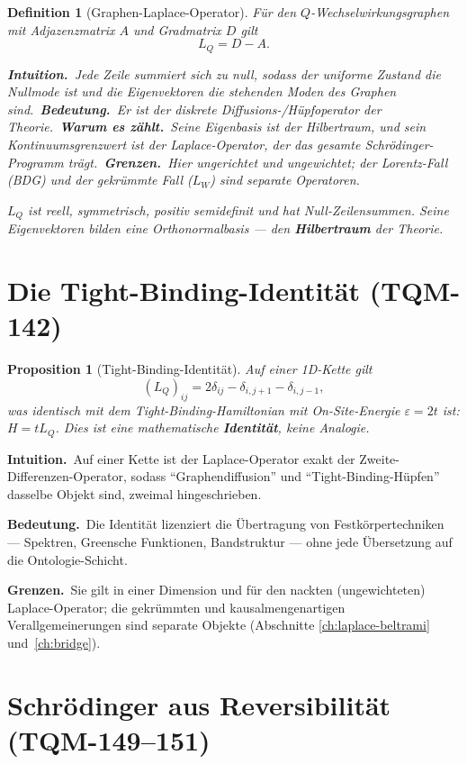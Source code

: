 \documentclass[10pt,twoside,openany]{book}
\newtheorem{proposition}[theorem]{Proposition}
\newtheorem{definition}[theorem]{Definition}
\newcommand{\theoremnotes}[3]{%
  \par\medskip\noindent
  \textbf{Intuition.}\ #1\par
  \textbf{Bedeutung.}\ #2\par
  \textbf{Grenzen.}\ #3\par}
\newcommand{\eqnotes}[4]{%
  \par\smallskip\noindent
  \textbf{Intuition.}\ #1\ 
  \textbf{Bedeutung.}\ #2\ 
  \textbf{Warum es zählt.}\ #3\ 
  \textbf{Grenzen.}\ #4\par}
\begin{document}
\begin{definition}[Graphen-Laplace-Operator]
Für den $Q$-Wechselwirkungsgraphen mit Adjazenzmatrix $A$ und Gradmatrix $D$ gilt
\begin{equation}
L_Q = D - A .
\end{equation}

\eqnotes
{Jede Zeile summiert sich zu null, sodass der uniforme Zustand die Nullmode ist und die
Eigenvektoren die stehenden Moden des Graphen sind.}
{Er ist der diskrete Diffusions-/Hüpfoperator der Theorie.}
{Seine Eigenbasis \emph{ist} der Hilbertraum, und sein Kontinuumsgrenzwert ist der
Laplace-Operator, der das gesamte Schr\"odinger-Programm trägt.}
{Hier ungerichtet und ungewichtet; der Lorentz-Fall (BDG) und der gekrümmte Fall ($L_W$)
sind separate Operatoren.}
$L_Q$ ist reell, symmetrisch, positiv semidefinit und hat Null-Zeilensummen. Seine
Eigenvektoren bilden eine Orthonormalbasis — den \textbf{Hilbertraum} der Theorie.
\end{definition}

\section{Die Tight-Binding-Identität (TQM-142)}

\begin{proposition}[Tight-Binding-Identität]
Auf einer 1D-Kette gilt
\begin{equation}
(L_Q)_{ij} = 2\delta_{ij} - \delta_{i,j+1} - \delta_{i,j-1},
\end{equation}
was \emph{identisch} mit dem Tight-Binding-Hamiltonian mit On-Site-Energie
$\varepsilon=2t$ ist: $H = t L_Q$. Dies ist eine mathematische \textbf{Identität}, keine
Analogie.
\end{proposition}

\theoremnotes
{Auf einer Kette ist der Laplace-Operator exakt der Zweite-Differenzen-Operator, sodass
``Graphendiffusion'' und ``Tight-Binding-Hüpfen'' dasselbe Objekt sind, zweimal
hingeschrieben.}
{Die Identität lizenziert die Übertragung von Festkörpertechniken --- Spektren,
Greensche Funktionen, Bandstruktur --- ohne jede Übersetzung auf die Ontologie-Schicht.}
{Sie gilt in einer Dimension und für den nackten (ungewichteten) Laplace-Operator; die
gekrümmten und kausalmengenartigen Verallgemeinerungen sind separate Objekte (Abschnitte
\ref{ch:laplace-beltrami} und~\ref{ch:bridge}).}

\section{Schr\"odinger aus Reversibilität (TQM-149--151)}
\end{document}
